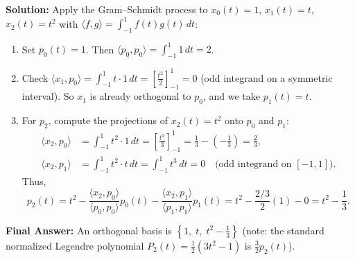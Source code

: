 \documentclass[11pt, letterpaper]{article}
\theoremstyle{definition}
\theoremstyle{remark}
\begin{document}
\textbf{Solution:}
Apply the Gram--Schmidt process to $x_0(t) = 1$, $x_1(t) = t$, $x_2(t) = t^2$ with $\langle f, g \rangle = \int_{-1}^1 f(t)g(t)\,dt$:
\begin{enumerate}
    \item Set $p_0(t) = 1$. Then $\langle p_0, p_0 \rangle = \int_{-1}^1 1\,dt = 2$.
    \item Check $\langle x_1, p_0 \rangle = \int_{-1}^1 t \cdot 1\,dt = \left[\frac{t^2}{2}\right]_{-1}^1 = 0$ (odd integrand on a symmetric interval). So $x_1$ is already orthogonal to $p_0$, and we take $p_1(t) = t$.
    \item For $p_2$, compute the projections of $x_2(t) = t^2$ onto $p_0$ and $p_1$:
    \begin{align*}
        \langle x_2, p_0 \rangle &= \int_{-1}^1 t^2 \cdot 1\,dt = \left[\frac{t^3}{3}\right]_{-1}^1 = \frac{1}{3} - \left(-\frac{1}{3}\right) = \frac{2}{3}, \\
        \langle x_2, p_1 \rangle &= \int_{-1}^1 t^2 \cdot t\,dt = \int_{-1}^1 t^3\,dt = 0 \quad \text{(odd integrand on } [-1, 1]\text{)}.
    \end{align*}
    Thus,
    \[
        p_2(t) = t^2 - \frac{\langle x_2, p_0 \rangle}{\langle p_0, p_0 \rangle}p_0(t) - \frac{\langle x_2, p_1 \rangle}{\langle p_1, p_1 \rangle}p_1(t) = t^2 - \frac{2/3}{2}(1) - 0 = t^2 - \frac{1}{3}.
    \]
\end{enumerate}
\textbf{Final Answer:} An orthogonal basis is $\displaystyle \left\{1,\; t,\; t^2 - \frac{1}{3}\right\}$ (note: the standard normalized Legendre polynomial $P_2(t) = \frac{1}{2}(3t^2 - 1)$ is $\frac{3}{2}p_2(t)$).
\end{document}

